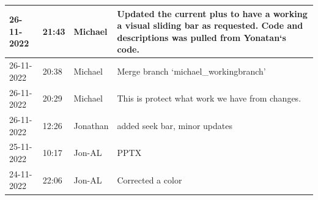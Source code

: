 \documentclass[11pt]{article}
\begin{document}
\begin{center}
\begin{longtable}{|p{2cm}|l|p{2cm}|p{10.5cm}|}
            26-11-2022                                 & 21:43                              & Michael                                 & Updated the current plus to have a working a visual sliding bar as requested. Code and descriptions was pulled from Yonatan`s code.                                                                                                                                                                          \\ \hline
            26-11-2022                                 & 20:38                              & Michael                                 & Merge branch `michael\_workingbranch'                                                                                                                                                                                                                                                                        \\ \hline
            26-11-2022                                 & 20:29                              & Michael                                 & This is protect what work we have from changes.                                                                                                                                                                                                                                                              \\ \hline
            26-11-2022                                 & 12:26                              & Jonathan                                & added seek bar, minor updates                                                                                                                                                                                                                                                                                \\ \hline
            25-11-2022                                 & 10:17                              & Jon-AL                                  & PPTX                                                                                                                                                                                                                                                                                                         \\ \hline
            24-11-2022                                 & 22:06                              & Jon-AL                                  & Corrected a color                                                                                                                                                                                                                                                                                            \\ \hline

\end{longtable}
\end{center}
\end{document}
